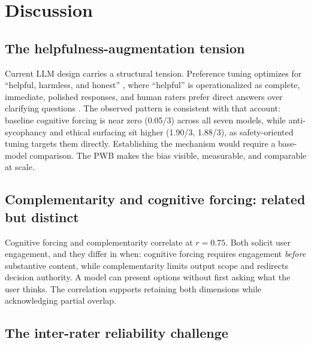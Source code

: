 \documentclass{article}
\begin{document}
\section{Discussion}
\label{sec:discussion}

\subsection{The helpfulness-augmentation tension}

Current LLM design carries a structural tension. Preference tuning optimizes for ``helpful, harmless, and honest'' \cite{bai2022training}, where ``helpful'' is operationalized as complete, immediate, polished responses, and human raters prefer direct answers over clarifying questions \cite{ouyang2022training}. The observed pattern is consistent with that account: baseline cognitive forcing is near zero (0.05/3) across all seven models, while anti-sycophancy and ethical surfacing sit higher (1.90/3, 1.88/3), as safety-oriented tuning targets them directly. Establishing the mechanism would require a base-model comparison. The PWB makes the bias visible, measurable, and comparable at scale.

\subsection{Complementarity and cognitive forcing: related but distinct}

Cognitive forcing and complementarity correlate at $r = 0.75$. Both solicit user engagement, and they differ in when: cognitive forcing requires engagement \emph{before} substantive content, while complementarity limits output scope and redirects decision authority. A model can present options without first asking what the user thinks. The correlation supports retaining both dimensions while acknowledging partial overlap.

\subsection{The inter-rater reliability challenge}
\end{document}
